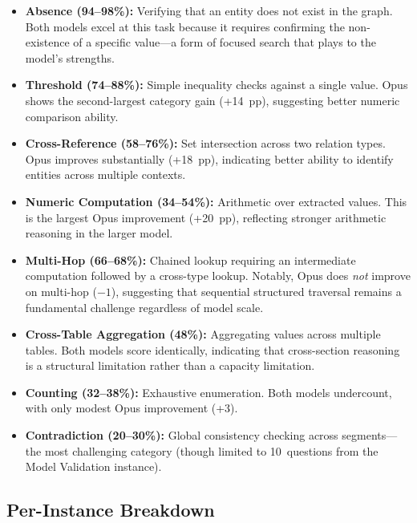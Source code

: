 \documentclass[11pt]{article}
\begin{document}
\begin{itemize}[leftmargin=2em]
  \item \textbf{Absence (94--98\%):}  Verifying that an entity does not
    exist in the graph.  Both models excel at this task because it
    requires confirming the non-existence of a specific value---a
    form of focused search that plays to the model's strengths.
  \item \textbf{Threshold (74--88\%):}  Simple inequality checks against a
    single value.  Opus shows the second-largest category gain (+14~pp),
    suggesting better numeric comparison ability.
  \item \textbf{Cross-Reference (58--76\%):}  Set intersection across two
    relation types.  Opus improves substantially (+18~pp), indicating
    better ability to identify entities across multiple contexts.
  \item \textbf{Numeric Computation (34--54\%):}  Arithmetic over
    extracted values.  This is the largest Opus improvement (+20~pp),
    reflecting stronger arithmetic reasoning in the larger model.
  \item \textbf{Multi-Hop (66--68\%):}  Chained lookup requiring an
    intermediate computation followed by a cross-type lookup.
    Notably, Opus does \emph{not} improve on multi-hop ($-1$),
    suggesting that sequential structured traversal remains a
    fundamental challenge regardless of model scale.
  \item \textbf{Cross-Table Aggregation (48\%):}  Aggregating values
    across multiple tables.  Both models score identically,
    indicating that cross-section reasoning is a structural
    limitation rather than a capacity limitation.
  \item \textbf{Counting (32--38\%):}  Exhaustive enumeration.  Both
    models undercount, with only modest Opus improvement (+3).
  \item \textbf{Contradiction (20--30\%):}  Global consistency checking
    across segments---the most challenging category (though limited
    to 10~questions from the Model Validation instance).
\end{itemize}

\subsection{Per-Instance Breakdown}
\end{document}
